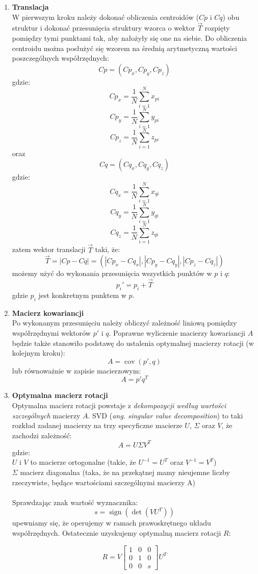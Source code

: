 \documentclass[licencjacka]{pracamgr}
\DeclareMathOperator{\cov}{cov}
\DeclareMathOperator{\sign}{sign}
\begin{document}
\begin{enumerate}
\item \textbf{Translacja} \\
W pierwszym kroku należy dokonać obliczenia centroidów ($Cp$ i $Cq$) obu struktur i dokonać przesunięcia struktury wzorca o wektor $\vec{T}$ rozpięty pomiędzy tymi punktami tak, aby nałożyły się one na siebie. Do obliczenia centroidu można posłużyć się wzorem na średnią arytmetyczną wartości poszczególnych współrzędnych: 
$$Cp = (Cp_x, Cp_y, Cp_z)$$
gdzie:
$$Cp_x = \frac{1}{N}\sum_{i=1}^{N}{x_{pi}}$$
$$Cp_y = \frac{1}{N}\sum_{i=1}^{N}{y_{pi}}$$
$$Cp_z = \frac{1}{N}\sum_{i=1}^{N}{z_{pi}}$$
oraz
$$Cq = (Cq_x, Cq_y, Cq_z)$$
gdzie:
$$Cq_x = \frac{1}{N}\sum_{i=1}^{N}{x_{qi}}$$
$$Cq_y = \frac{1}{N}\sum_{i=1}^{N}{y_{qi}}$$
$$Cq_z = \frac{1}{N}\sum_{i=1}^{N}{z_{qi}}$$
zatem wektor translacji $\vec{T}$ taki, że:
$$ \vec{T} = |Cp-Cq| =(|Cp_x-Cq_x|,|Cp_y-Cq_y|,|Cp_z-Cq_z|)$$
możemy użyć do wykonania przesunięcia wszystkich punktów w $p$ i $q$:
$$p_i'=p_i+\vec{T}$$
gdzie $p_i$ jest konkretnym punktem w $p$.
\item \textbf{Macierz kowariancji} \\
Po wykonanym przesunięciu należy obliczyć zależność liniową pomiędzy współrzędnymi wektorów $p'$ i $q$. Poprawne wyliczenie macierzy kowariancji $A$ będzie także stanowiło podstawę do ustalenia optymalnej macierzy rotacji (w kolejnym kroku):
$$ 
A=\cov(p',q)
$$
lub równoważnie w zapisie macierzowym:
$$
 A = p'q^T
$$

\item \textbf{Optymalna macierz rotacji} \\
Optymalna macierz rotacji powstaje z \textit{dekompozycji według wartości szczególnych} macierzy $A$. SVD (\textit{ang. singular value decomposition}) to taki rozkład zadanej macierzy na trzy specyficzne macierze $U$, $\Sigma$ oraz $V$, że zachodzi zależność:
$$
A=U \Sigma V^T
$$
gdzie:
\\
$U$ i $V$ to macierze ortogonalne (takie, że $U^{-1}=U^{T}$ oraz $V^{-1}=V^{T}$)
\\
$\Sigma$ macierz diagonalna (taka, że na przekątnej mamy nieujemne liczby rzeczywiste, będące wartościami szczególnymi macierzy A)
\\
\\
Sprawdzając znak wartość wyznacznika:
$$
s=\sign(\det(VU^T))
$$
upewniamy się, że operujemy w ramach prawoskrętnego układu współrzędnych. Ostatecznie uzyskujemy optymalną macierz rotacji $R$:

$$
R=V
\begin{bmatrix}
 1 & 0 & 0 \\
 0 & 1 & 0 \\
 0 & 0 & s
\end{bmatrix}
U^T
$$

\end{enumerate}
\end{document}
